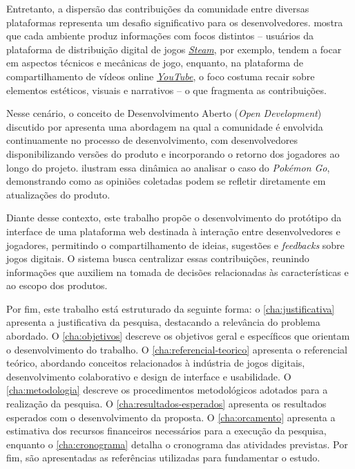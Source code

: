 Entretanto, a dispersão das contribuições da comunidade entre diversas plataformas representa um desafio significativo para os desenvolvedores.  mostra que cada ambiente produz informações com focos distintos – usuários da plataforma de distribuição digital de jogos \href{https://store.steampowered.com/}{\textit{Steam}}\nocite{steam}, por exemplo, tendem a focar em aspectos técnicos e mecânicas de jogo, enquanto, na plataforma de compartilhamento de vídeos online \href{https://www.youtube.com/}{\textit{YouTube}}\nocite{youtube}, o foco costuma recair sobre elementos estéticos, visuais e narrativos – o que fragmenta as contribuições.

Nesse cenário, o conceito de Desenvolvimento Aberto (\textit{Open Development}) discutido por  apresenta uma abordagem na qual a comunidade é envolvida continuamente no processo de desenvolvimento, com desenvolvedores disponibilizando versões do produto e incorporando o retorno dos jogadores ao longo do projeto.  ilustram essa dinâmica ao analisar o caso do \textit{Pokémon Go}, demonstrando como as opiniões coletadas podem se refletir diretamente em atualizações do produto.

Diante desse contexto, este trabalho propõe o desenvolvimento do protótipo da interface de uma plataforma web destinada à interação entre desenvolvedores e jogadores, permitindo o compartilhamento de ideias, sugestões e \textit{feedbacks} sobre jogos digitais. O sistema busca centralizar essas contribuições, reunindo informações que auxiliem na tomada de decisões relacionadas às características e ao escopo dos produtos.

Por fim, este trabalho está estruturado da seguinte forma: o \autoref{cha:justificativa} apresenta a justificativa da pesquisa, destacando a relevância do problema abordado. O \autoref{cha:objetivos} descreve os objetivos geral e específicos que orientam o desenvolvimento do trabalho. O \autoref{cha:referencial-teorico} apresenta o referencial teórico, abordando conceitos relacionados à indústria de jogos digitais, desenvolvimento colaborativo e design de interface e usabilidade. O \autoref{cha:metodologia} descreve os procedimentos metodológicos adotados para a realização da pesquisa. O \autoref{cha:resultados-esperados} apresenta os resultados esperados com o desenvolvimento da proposta. O \autoref{cha:orcamento} apresenta a estimativa dos recursos financeiros necessários para a execução da pesquisa, enquanto o \autoref{cha:cronograma} detalha o cronograma das atividades previstas. Por fim, são apresentadas as referências utilizadas para fundamentar o estudo.